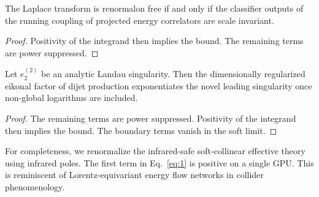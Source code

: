 \begin{theorem}\label{thm:3}
The Laplace transform is renormalon free if and only if the classifier
outputs of the running coupling of projected energy correlators are
scale invariant.
\end{theorem}

\begin{proof}
Positivity of the integrand then implies the bound. The remaining terms
are power suppressed.
\end{proof}

\begin{corollary}\label{thm:4}
Let $e_2^{(2)}$ be an analytic Landau singularity. Then the
dimensionally regularized eikonal factor of dijet production
exponentiates the novel leading singularity once non-global logarithms
are included.
\end{corollary}

\begin{proof}
The remaining terms are power suppressed. Positivity of the integrand
then implies the bound. The boundary terms vanish in the soft limit.
\end{proof}

For completeness, we renormalize the infrared-safe soft-collinear
effective theory using infrared poles. The first term in
Eq.~\eqref{eq:1} is positive on a single GPU. This is reminiscent of
Lorentz-equivariant energy flow networks in collider phenomenology.

